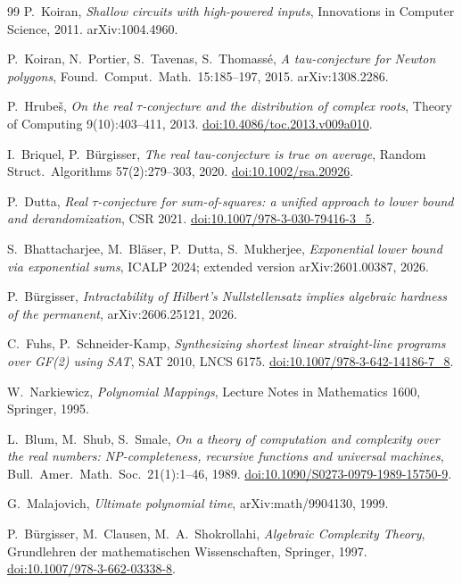 \documentclass[11pt]{article}
\theoremstyle{definition}
\theoremstyle{remark}
\begin{document}
\begin{thebibliography}{99}
 P.~Koiran, \emph{Shallow circuits with high-powered inputs},
Innovations in Computer Science, 2011. arXiv:1004.4960.

 P.~Koiran, N.~Portier, S.~Tavenas, S.~Thomass\'e, \emph{A
tau-conjecture for Newton polygons}, Found.\ Comput.\ Math.\ 15:185--197, 2015.
arXiv:1308.2286.

 P.~Hrube\v{s}, \emph{On the real $\tau$-conjecture and the
distribution of complex roots}, Theory of Computing 9(10):403--411, 2013.
\href{https://doi.org/10.4086/toc.2013.v009a010}{doi:10.4086/toc.2013.v009a010}.

 I.~Briquel, P.~B\"urgisser, \emph{The real
tau-conjecture is true on average}, Random Struct.\ Algorithms 57(2):279--303, 2020.
\href{https://doi.org/10.1002/rsa.20926}{doi:10.1002/rsa.20926}.

 P.~Dutta, \emph{Real $\tau$-conjecture for sum-of-squares: a
unified approach to lower bound and derandomization}, CSR 2021.
\href{https://doi.org/10.1007/978-3-030-79416-3_5}{doi:10.1007/978-3-030-79416-3\_5}.

 S.~Bhattacharjee, M.~Bl\"aser, P.~Dutta, S.~Mukherjee,
\emph{Exponential lower bound via exponential sums}, ICALP 2024; extended version
arXiv:2601.00387, 2026.

 P.~B\"urgisser, \emph{Intractability of Hilbert's
Nullstellensatz implies algebraic hardness of the permanent}, arXiv:2606.25121, 2026.

 C.~Fuhs, P.~Schneider-Kamp, \emph{Synthesizing
shortest linear straight-line programs over GF(2) using SAT}, SAT 2010, LNCS 6175.
\href{https://doi.org/10.1007/978-3-642-14186-7_8}{doi:10.1007/978-3-642-14186-7\_8}.

 W.~Narkiewicz, \emph{Polynomial Mappings}, Lecture Notes in
Mathematics 1600, Springer, 1995.

 L.~Blum, M.~Shub, S.~Smale, \emph{On a theory of computation and complexity
over the real numbers: NP-completeness, recursive functions and universal machines}, Bull.\
Amer.\ Math.\ Soc.\ 21(1):1--46, 1989.
\href{https://doi.org/10.1090/S0273-0979-1989-15750-9}{doi:10.1090/S0273-0979-1989-15750-9}.

 G.~Malajovich, \emph{Ultimate polynomial time}, arXiv:math/9904130,
1999.

 P.~B\"urgisser, M.~Clausen, M.~A.~Shokrollahi, \emph{Algebraic Complexity
Theory}, Grundlehren der mathematischen Wissenschaften, Springer, 1997.
\href{https://doi.org/10.1007/978-3-662-03338-8}{doi:10.1007/978-3-662-03338-8}.


\end{thebibliography}
\end{document}
